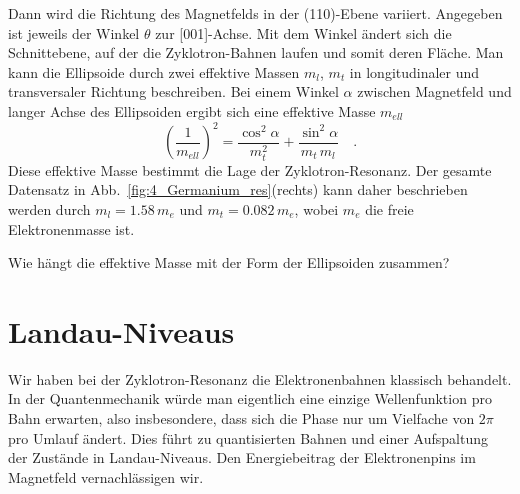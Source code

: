 Dann wird die Richtung des Magnetfelds in der (110)-Ebene variiert.  Angegeben ist jeweils der Winkel $\theta$ zur [001]-Achse. Mit dem Winkel ändert sich die Schnittebene, auf der die Zyklotron-Bahnen laufen und somit deren Fläche. Man kann die Ellipsoide durch zwei effektive Massen $m_l$, $m_t$ in longitudinaler und transversaler Richtung beschreiben. Bei einem Winkel $\alpha$ zwischen Magnetfeld und langer Achse des Ellipsoiden ergibt sich eine effektive Masse $m_{ell}$
\begin{equation}
   \left( \frac{1}{m_{ell}} \right)^2 = \frac{\cos^2 \alpha}{m_t^2} + \frac{\sin^2 \alpha}{m_t \, m_l} \quad .
\end{equation}
Diese effektive Masse bestimmt die Lage der Zyklotron-Resonanz. Der gesamte Datensatz in Abb.~\ref{fig:4_Germanium_res}(rechts) kann daher beschrieben werden durch $m_l = 1.58 \, m_e$ und $m_t =  0.082 \, m_e$, wobei $m_e$ die freie Elektronenmasse ist.



\begin{questions}
   \item Wie hängt die effektive Masse mit der  Form der Ellipsoiden zusammen?
\end{questions}




\section{Landau-Niveaus}

Wir haben bei der Zyklotron-Resonanz die Elektronenbahnen klassisch behandelt. In der Quantenmechanik würde man eigentlich eine einzige Wellenfunktion pro Bahn erwarten, also insbesondere, dass sich die Phase nur um Vielfache von $2\pi$ pro Umlauf ändert. Dies führt zu quantisierten Bahnen und einer Aufspaltung der Zustände in Landau-Niveaus. Den Energiebeitrag der Elektronenpins im Magnetfeld vernachlässigen wir.

